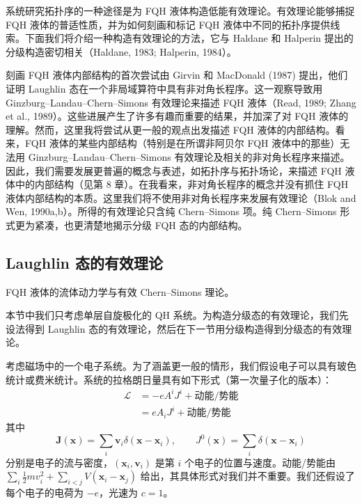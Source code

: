 系统研究拓扑序的一种途径是为 FQH 液体构造低能有效理论。有效理论能够捕捉 FQH 液体的普适性质，并为如何刻画和标记 FQH 液体中不同的拓扑序提供线索。下面我们将介绍一种构造有效理论的方法，它与 Haldane 和 Halperin 提出的分级构造密切相关（Haldane, 1983; Halperin, 1984）。

刻画 FQH 液体内部结构的首次尝试由 Girvin 和 MacDonald (1987) 提出，他们证明 Laughlin 态在一个非局域算符中具有非对角长程序。这一观察导致用 Ginzburg--Landau--Chern--Simons 有效理论来描述 FQH 液体（Read, 1989; Zhang et al., 1989）。这些进展产生了许多有趣而重要的结果，并加深了对 FQH 液体的理解。然而，这里我将尝试从更一般的观点出发描述 FQH 液体的内部结构。看来，FQH 液体的某些内部结构（特别是在所谓非阿贝尔 FQH 液体中的那些）无法用 Ginzburg--Landau--Chern--Simons 有效理论及相关的非对角长程序来描述。因此，我们需要发展更普遍的概念与表述，如拓扑序与拓扑场论，来描述 FQH 液体中的内部结构（见第 8 章）。在我看来，非对角长程序的概念并没有抓住 FQH 液体内部结构的本质。这里我们将不使用非对角长程序来发展有效理论（Blok and Wen, 1990a,b）。所得的有效理论只含纯 Chern--Simons 项。纯 Chern--Simons 形式更为紧凑，也更清楚地揭示分级 FQH 态的内部结构。

\subsection{Laughlin 态的有效理论}

\begin{keypoints}
\item FQH 液体的流体动力学与有效 Chern--Simons 理论。
\end{keypoints}

本节中我们只考虑单层自旋极化的 QH 系统。为构造分级态的有效理论，我们先设法得到 Laughlin 态的有效理论，然后在下一节用分级构造得到分级态的有效理论。

考虑磁场中的一个电子系统。为了涵盖更一般的情形，我们假设电子可以具有玻色统计或费米统计。系统的拉格朗日量具有如下形式（第一次量子化的版本）：
\begin{equation*}
\begin{aligned}
\mathcal{L}&=-eA^iJ^i+\text{动能/势能}\\
&=eA_iJ^i+\text{动能/势能}
\end{aligned}
\tag{7.3.1}
\end{equation*}
其中
\begin{equation*}
\pmb{J}(\pmb{x})=\sum_i\pmb{v}_i\delta(\pmb{x}-\pmb{x}_i),\qquad J^0(\pmb{x})=\sum_i\delta(\pmb{x}-\pmb{x}_i)
\tag{7.3.2}
\end{equation*}
分别是电子的流与密度，$(\pmb{x}_i,\pmb{v}_i)$ 是第 $i$ 个电子的位置与速度。动能/势能由 $\sum_i\frac{1}{2}mv_i^2+\sum_{i<j}V(\pmb{x}_i-\pmb{x}_j)$ 给出，其具体形式对我们并不重要。我们还假设了每个电子的电荷为 $-e$，光速为 $c=1$。

